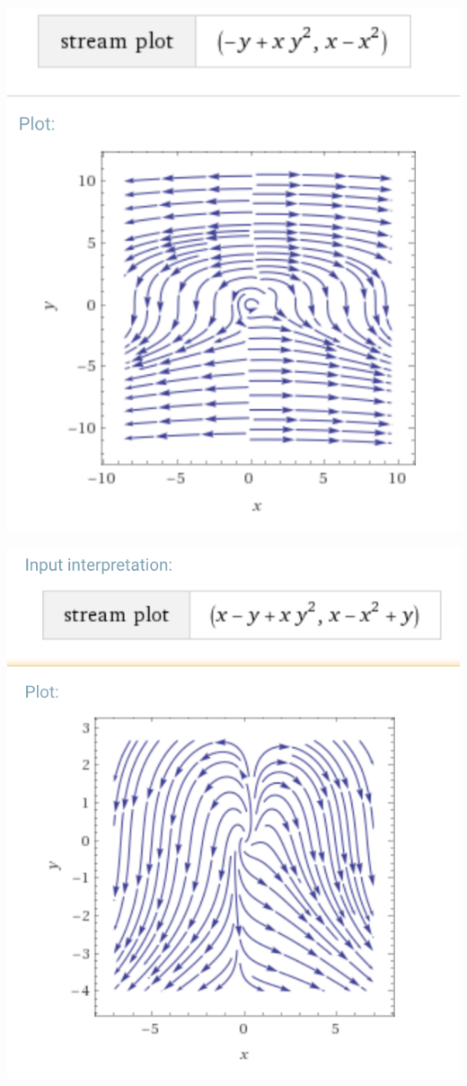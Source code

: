 \documentclass[10pt,a4paper]{article}
\begin{document}
	\includegraphics[width=  \textwidth, keepaspectratio]{img/7a}
	
	\includegraphics[width=  \textwidth, keepaspectratio]{img/7b}
	
\end{document}

